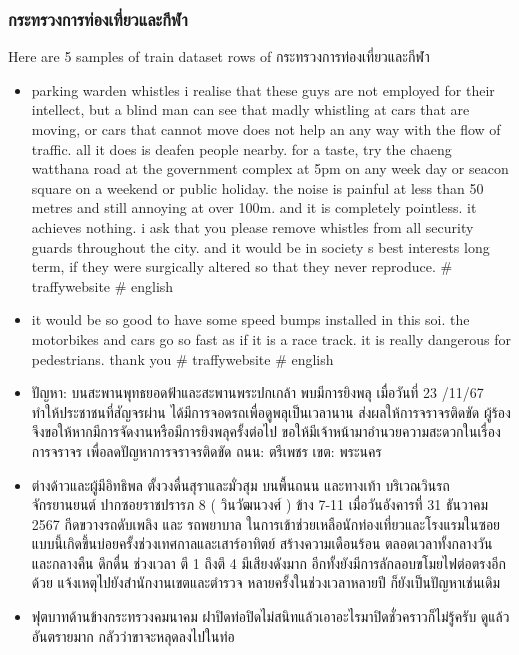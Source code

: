 \documentclass[12pt, a4paper]{article}
\begin{document}
    \pagebreak

                \subsubsection{กระทรวงการท่องเที่ยวและกีฬา}
                    Here are 5 samples of train dataset rows of กระทรวงการท่องเที่ยวและกีฬา
                    \begin{itemize}
                        \item parking warden whistles i realise that these guys are not employed for their intellect,
                        but a blind man can see that madly whistling at cars that are moving, or cars that cannot move does not help
                        an any way with the flow of traffic. all it does is deafen people nearby.
                        for a taste, try the chaeng watthana road at the government complex at 5pm on any week day or seacon square
                        on a weekend or public holiday. the noise is painful at less than 50 metres and still annoying at over 100m.
                        and it is completely pointless. it achieves nothing. i ask that you please remove whistles from all security
                        guards throughout the city. and it would be in society s best interests long term, if they were surgically
                        altered so that they never reproduce. \# traffywebsite \# english
                        \item it would be so good to have some speed bumps installed in this soi.
                        the motorbikes and cars go so fast as if it is a race track.
                        it is really dangerous for pedestrians. thank you \# traffywebsite \# english
                        \item ปัญหา: บนสะพานพุทธยอดฟ้าและสะพานพระปกเกล้า พบมีการยิงพลุ เมื่อวันที่ 23 /11/67 ทำให้ประชาชนที่สัญจรผ่าน
                        ได้มีการจอดรถเพื่อดูพลุเป็นเวลานาน ส่งผลให้การจราจรติดขัด ผู้ร้องจึงขอให้หากมีการจัดงานหรือมีการยิงพลุครั้งต่อไป
                        ขอให้มีเจ้าหน้ามาอำนวยความสะดวกในเรื่องการจราจร เพื่อลดปัญหาการจราจรติดขัด ถนน: ตรีเพชร เขต: พระนคร
                        \item ต่างด้าวและผู้มีอิทธิพล ตั้งวงดื่นสุราและมั่วสุม บนพื้นถนน และทางเท้า บริเวณวินรถจักรยานยนต์ ปากซอยราชปรารภ 8 ( วินวัฒนวงศ์ )
                        ข้าง 7-11 เมื่อวันอังคารที่ 31 ธันวาคม 2567 กีดขวางรถดับเพลิง และ รถพยาบาล ในการเข้าช่วยเหลือนักท่องเที่ยวและโรงแรมในซอย
                        แบบนี้เกิดขึ้นบ่อยครั้งช่วงเทศกาลและเสาร์อาทิตย์ สร้างความเดือนร้อน ตลอดเวลาทั้งกลางวันและกลางคืน ดึกดื่น ช่วงเวลา ตี 1 ถึงตึ 4 มีเสียงดังมาก
                        อีกทั้งยังมีการลักลอบขโมยไฟต่อตรงอีกด้วย แจ้งเหตุไปยังสำนักงานเขตและตำรวจ หลายครั้งในช่วงเวลาหลายปี ก็ยังเป็นปัญหาเช่นเดิม
                        \item ฟุตบาทด้านข้างกระทรวงคมนาคม ฝาปิดท่อปิดไม่สนิทแล้วเอาอะไรมาปิดชั่วคราวก็ไม่รู้ครับ ดูแล้วอันตรายมาก กลัวว่าขาจะหลุดลงไปในท่อ
                    \end{itemize}
\end{document}
